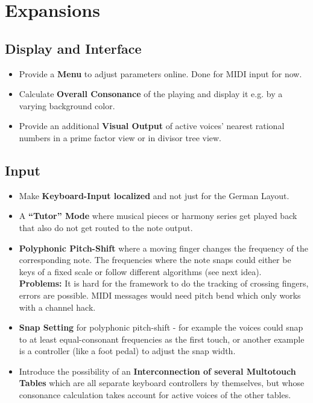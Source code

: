 \documentclass[12pt,a4paper,titlepage,oneside]{report}
\begin{document}
\section{Expansions}


\subsection{Display and Interface}

\begin{itemize}

	\item Provide a \textbf{Menu} to adjust parameters online. Done for MIDI input for now.
	
	\item Calculate \textbf{Overall Consonance} of the playing and display it e.g. by a varying background color.

	\item Provide an additional \textbf{Visual Output} of active voices' nearest rational numbers in a prime factor view or in divisor tree view.

\end{itemize}


\subsection{Input}

\begin{itemize}

	\item Make \textbf{Keyboard-Input localized} and not just for the German Layout.

	\item A \textbf{``Tutor'' Mode} where musical pieces or harmony series get played back that also do not get routed to the note output.

	\item \textbf{Polyphonic Pitch-Shift} where a moving finger changes the frequency of the corresponding note. The frequencies where the note snaps could either be keys of a fixed scale or follow different algorithms (see next idea). \\
	\textbf{Problems:} It is hard for the framework to do the tracking of crossing fingers, errors are possible. MIDI messages would need pitch bend which only works with a channel hack.

	\item \textbf{Snap Setting} for polyphonic pitch-shift - for example the voices could snap to at least equal-consonant frequencies as the first touch, or another example is a controller (like a foot pedal) to adjust the snap width.

	\item Introduce the possibility of an \textbf{Interconnection of several Multotouch Tables} which are all separate keyboard controllers by themselves, but whose consonance calculation takes account for active voices of the other tables.

\end{itemize}
\end{document}

